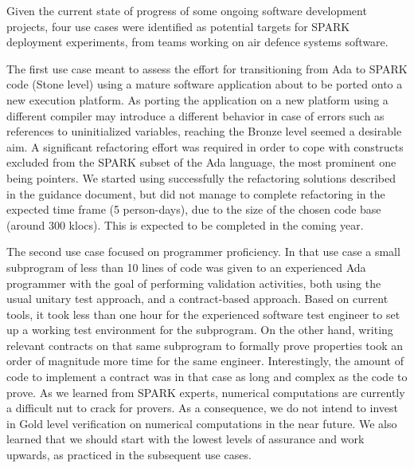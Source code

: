 \documentclass{llncs}
\begin{document}
Given the current state of progress of some ongoing software development
projects, four use cases were identified as potential targets for SPARK
deployment experiments, from teams working on air defence systems software.

The first use case meant to assess the effort for transitioning from Ada to
SPARK code (Stone level) using a mature software application about to be ported
onto a new execution platform. As porting the application on a new platform
using a different compiler may introduce a different behavior in case of errors
such as references to uninitialized variables, reaching the Bronze level seemed
a desirable aim. A significant refactoring effort was required in order to cope
with constructs excluded from the SPARK subset of the Ada language, the most
prominent one being pointers. We started using successfully the refactoring
solutions described in the guidance document, but did not manage to complete
refactoring in the expected time frame (5 person-days), due to the size of the
chosen code base (around 300 klocs). This is expected to be completed in the
coming year.

The second use case focused on programmer proficiency. In that use case a small
subprogram of less than 10 lines of code was given to an experienced Ada
programmer with the goal of performing validation activities, both using the
usual unitary test approach, and a contract-based approach. Based on current
tools, it took less than one hour for the experienced software test engineer to
set up a working test environment for the subprogram. On the other hand,
writing relevant contracts on that same subprogram to formally prove properties
took an order of magnitude more time for the same engineer. Interestingly, the
amount of code to implement a contract was in that case as long and complex as
the code to prove. As we learned from SPARK experts, numerical computations are
currently a difficult nut to crack for provers. As a consequence, we do not
intend to invest in Gold level verification on numerical computations in the
near future. We also learned that we should start with the lowest levels of
assurance and work upwards, as practiced in the subsequent use cases.
\end{document}
